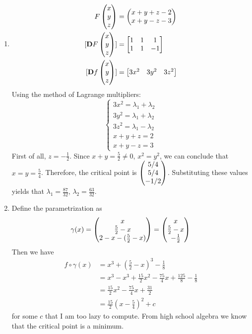 \documentclass{homework}
\begin{document}
\begin{problem}{4}
\begin{enumerate}
\item
\begin{align*}
F\pmat{x\\y\\z}             &= \pmat{x+y+z-2\\x+y-z-3}\\
[\mathbf{D}F\pmat{x\\y\\z}] &= \bmat{1&1&1\\1&1&-1}\\
[\mathbf{D}f\pmat{x\\y\\z}] &= \bmat{3x^2&3y^2&3z^2}
\end{align*}
Using the method of Lagrange multipliers:
$$\left\{
\begin{aligned}
3x^2 = \lambda_1 + \lambda_2\\
3y^2 = \lambda_1 + \lambda_2\\
3z^2 = \lambda_1 - \lambda_2\\
x+y+z=2\\
x+y-z=3
\end{aligned}
\right.$$
First of all, $z = -\frac{1}{2}$. Since $x + y = \frac{5}{2} \neq 0$,
$x^2 = y^2$, we can conclude that $x = y = \frac{5}{4}$. Therefore, the
critical point is $\begin{pmatrix}5/4\\5/4\\-1/2\end{pmatrix}$. Substituting these values yields that
$\lambda_1 = \frac{87}{32}$, $\lambda_2 = \frac{63}{32}$.

\item
Define the parametrization as
$$\gamma(x) = \begin{pmatrix}x\\\frac{5}{2}-x\\2-x-(\frac{5}{2}-x)\end{pmatrix}
= \begin{pmatrix}x\\\frac{5}{2}-x\\-\frac{1}{2}\end{pmatrix}$$
Then we have
\begin{align*}
f \circ \gamma(x)
&= x^3 + (\frac{5}{2} - x)^3 - \frac{1}{8} \\
&= x^3-x^3+\frac{15}{2}x^2-\frac{75}{4}x+\frac{125}{8}-\frac{1}{8} \\
&= \frac{15}{2}x^2-\frac{75}{4}x+\frac{31}{2} \\
&= \frac{15}{2}(x-\frac{5}{4})^2 + c
\end{align*}
for some $c$ that I am too lazy to compute. From high school algebra we know
that the critical point is a minimum.
\end{enumerate}
\end{problem}
\end{document}
